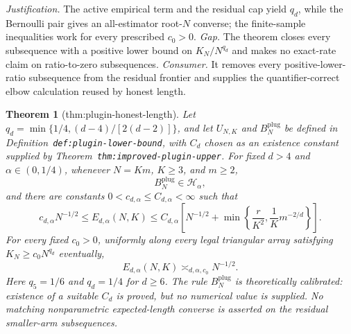 \documentclass{article}
\newtheorem{theorem}{Theorem}
\begin{document}
\par\smallskip\noindent \textit{Justification.} The active empirical term and the residual cap yield \(q_d\), while the Bernoulli pair gives an all-estimator root-\(N\) converse; the finite-sample inequalities work for every prescribed \(c_0>0\). \textit{Gap.} The theorem closes every subsequence with a positive lower bound on \(K_N/N^{q_d}\) and makes no exact-rate claim on ratio-to-zero subsequences. \textit{Consumer.} It removes every positive-lower-ratio subsequence from the residual frontier and supplies the quantifier-correct elbow calculation reused by honest length.

\begin{theorem}[thm:plugin-honest-length]\label{thm:plugin-honest-length}
Let \(q_d=\min\{1/4,(d-4)/[2(d-2)]\}\), and let \(U_{N,K}\) and \(B_N^{\mathrm{plug}}\) be defined in Definition~\texttt{def:plugin-lower-bound}, with \(C_d\) chosen as an existence constant supplied by Theorem~\texttt{thm:improved-plugin-upper}.  For fixed \(d>4\) and \(\alpha\in(0,1/4)\), whenever \(N=Km\), \(K\ge3\), and \(m\ge2\),
\[
B_N^{\mathrm{plug}}\in\mathcal H_\alpha,
\]
and there are constants \(0<c_{d,\alpha}\le C_{d,\alpha}<\infty\) such that
\[
c_{d,\alpha}N^{-1/2}
\le E_{d,\alpha}(N,K)
\le C_{d,\alpha}\left[N^{-1/2}+\min\left\{\frac r{K^2},\frac1K m^{-2/d}\right\}\right].
\]
For every fixed \(c_0>0\), uniformly along every legal triangular array satisfying \(K_N\ge c_0N^{q_d}\) eventually,
\[
E_{d,\alpha}(N,K)\asymp_{d,\alpha,c_0}N^{-1/2}.
\]
Here \(q_5=1/6\) and \(q_d=1/4\) for \(d\ge6\).  The rule \(B_N^{\mathrm{plug}}\) is theoretically calibrated: existence of a suitable \(C_d\) is proved, but no numerical value is supplied.  No matching nonparametric expected-length converse is asserted on the residual smaller-arm subsequences.
\end{theorem}
\end{document}
